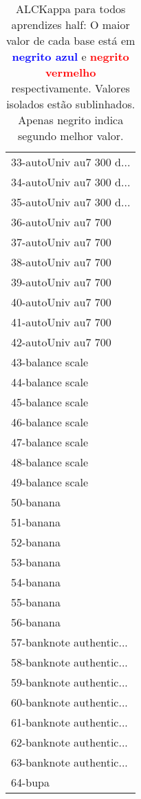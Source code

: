 \begin{table}[h]
\caption{ALCKappa para todos aprendizes half: O maior valor de cada base está em \textcolor{blue}{\textbf{negrito azul}} e \textcolor{red}{\textbf{negrito vermelho}} respectivamente. Valores isolados estão sublinhados. Apenas negrito indica segundo melhor valor.}
\begin{center}\begin{tabular}{l}
 & \\ \hline 33-autoUniv au7 300 d... &  \\
34-autoUniv au7 300 d... &  \\
35-autoUniv au7 300 d... &  \\
36-autoUniv au7 700 &  \\
37-autoUniv au7 700 &  \\
38-autoUniv au7 700 &  \\
39-autoUniv au7 700 &  \\ \hline
40-autoUniv au7 700 &  \\
41-autoUniv au7 700 &  \\
42-autoUniv au7 700 &  \\
43-balance scale &  \\
44-balance scale &  \\
45-balance scale &  \\
46-balance scale &  \\ \hline
47-balance scale &  \\
48-balance scale &  \\
49-balance scale &  \\
50-banana &  \\
51-banana &  \\
52-banana &  \\
53-banana &  \\ \hline
54-banana &  \\
55-banana &  \\
56-banana &  \\
57-banknote authentic... &  \\
58-banknote authentic... &  \\
59-banknote authentic... &  \\
60-banknote authentic... &  \\ \hline
61-banknote authentic... &  \\
62-banknote authentic... &  \\
63-banknote authentic... &  \\
64-bupa &  \\\end{tabular}\label{stratsALCKappa1AllReduxHalfb}
\end{center}
\end{table}
